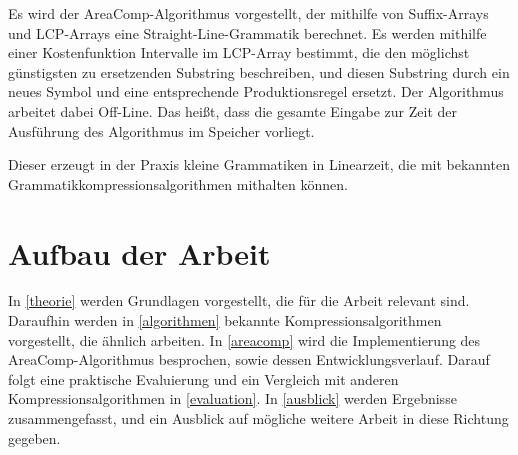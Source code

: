 Es wird der AreaComp-Algorithmus vorgestellt, der mithilfe von Suffix-Arrays und LCP-Arrays \cite{manber_suffix_1993} eine Straight-Line-Grammatik berechnet. Es werden mithilfe einer Kostenfunktion Intervalle im LCP-Array bestimmt, die den möglichst günstigsten zu ersetzenden Substring beschreiben, und diesen Substring durch ein neues Symbol und eine entsprechende Produktionsregel ersetzt.
Der Algorithmus arbeitet dabei Off-Line. Das heißt, dass die gesamte Eingabe zur Zeit der Ausführung des Algorithmus im Speicher vorliegt.

Dieser erzeugt in der Praxis kleine Grammatiken in Linearzeit, die mit bekannten Grammatikkompressionsalgorithmen mithalten können.

\section{Aufbau der Arbeit}

In \autoref{theorie} werden Grundlagen vorgestellt, die für die Arbeit relevant sind. Daraufhin werden in \autoref{algorithmen} bekannte Kompressionsalgorithmen vorgestellt, die ähnlich arbeiten. In \autoref{areacomp} wird die Implementierung des AreaComp-Algorithmus besprochen, sowie dessen Entwicklungsverlauf. Darauf folgt eine praktische Evaluierung und ein Vergleich mit anderen Kompressionsalgorithmen in \autoref{evaluation}. In \autoref{ausblick} werden Ergebnisse zusammengefasst, und ein Ausblick auf mögliche weitere Arbeit in diese Richtung gegeben.
